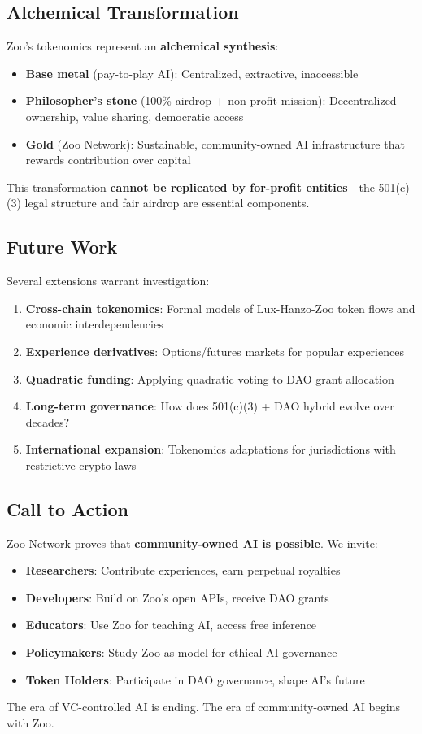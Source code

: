 \subsection{Alchemical Transformation}

Zoo's tokenomics represent an \textbf{alchemical synthesis}:
\begin{itemize}
\item \textbf{Base metal} (pay-to-play AI): Centralized, extractive, inaccessible
\item \textbf{Philosopher's stone} (100\% airdrop + non-profit mission): Decentralized ownership, value sharing, democratic access
\item \textbf{Gold} (Zoo Network): Sustainable, community-owned AI infrastructure that rewards contribution over capital
\end{itemize}

This transformation \textbf{cannot be replicated by for-profit entities} - the 501(c)(3) legal structure and fair airdrop are essential components.

\subsection{Future Work}

Several extensions warrant investigation:

\begin{enumerate}
\item \textbf{Cross-chain tokenomics}: Formal models of Lux-Hanzo-Zoo token flows and economic interdependencies
\item \textbf{Experience derivatives}: Options/futures markets for popular experiences
\item \textbf{Quadratic funding}: Applying quadratic voting to DAO grant allocation
\item \textbf{Long-term governance}: How does 501(c)(3) + DAO hybrid evolve over decades?
\item \textbf{International expansion}: Tokenomics adaptations for jurisdictions with restrictive crypto laws
\end{enumerate}

\subsection{Call to Action}

Zoo Network proves that \textbf{community-owned AI is possible}. We invite:
\begin{itemize}
\item \textbf{Researchers}: Contribute experiences, earn perpetual royalties
\item \textbf{Developers}: Build on Zoo's open APIs, receive DAO grants
\item \textbf{Educators}: Use Zoo for teaching AI, access free inference
\item \textbf{Policymakers}: Study Zoo as model for ethical AI governance
\item \textbf{Token Holders}: Participate in DAO governance, shape AI's future
\end{itemize}

The era of VC-controlled AI is ending. The era of community-owned AI begins with Zoo.

